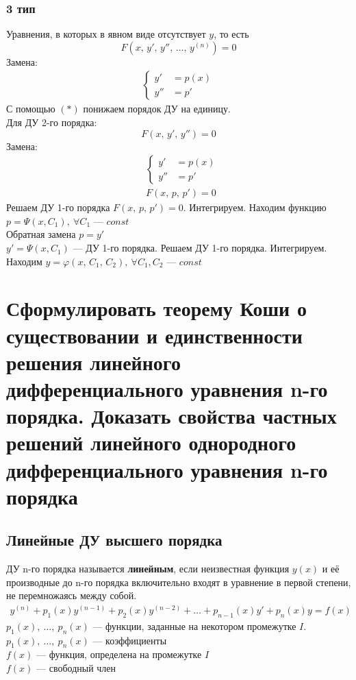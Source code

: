 \subsubsection*{3 тип}
Уравнения, в которых в явном виде отсутствует $y$, то есть
\[
    \boxed{F\left(x,\, y',\, y'',\, \ldots,\, y^{(n)}\right) = 0}
\]
Замена: 
\begin{align*}
    \left\{ \begin{aligned}
        y' &= p(x) \\
        y'' &= p'
    \end{aligned} \right. \tag{$*$}
\end{align*}
С помощью $(*)$ понижаем порядок ДУ на единицу. \\ 
Для ДУ 2-го порядка:
\[
    F(x,\, y',\, y'') = 0
\]
Замена:
\begin{align*}
    & \left\{ \begin{aligned}
        y' &= p(x) \\
        y'' &= p'
    \end{aligned} \right. \tag{$*$} \\
    & F(x,\, p,\, p') = 0
\end{align*}
 Решаем ДУ 1-го порядка $F(x,\, p,\, p') = 0$. Интегрируем. Находим функцию\break$p = \Psi (x, C_1),\ \forall C_1$ --- $const$ \\[1ex]
 Обратная замена $p = y'$ \\[1ex]
 $y' = \Psi (x, C_1)$ --- ДУ 1-го порядка. Решаем ДУ 1-го порядка. Интегрируем. Находим $y = \varphi (x,\, C_1,\, C_2),\ \forall C_1, C_2$ --- $const$

\newpage
\section{Сформулировать теорему Коши о существовании и единственности решения линейного дифференциального уравнения n-го порядка. Доказать свойства частных решений линейного однородного дифференциального уравнения n-го порядка}
\setcounter{equation}{0}
\subsection*{Линейные ДУ высшего порядка}
\begin{definition}
    ДУ n-го порядка называется \textbf{линейным}, если неизвестная функция $y(x)$ и её производные до n-го порядка включительно входят в уравнение в первой степени, не перемножаясь между собой.
    \begin{gather}
        \boxed{y^{(n)} + p_1(x)y^{(n-1)}  + p_2(x)y^{(n-2)} + \ldots + p_{n-1}(x)y' + p_n(x)y = f(x)}
    \end{gather}
    $p_1(x),\ \ldots,\ p_n (x)$ --- функции, заданные на некотором промежутке $I$.\\
    $p_1(x),\ \ldots,\ p_n (x)$ --- коэффициенты \\
    $f(x)$ --- функция, определена на промежутке $I$ \\
    $f(x)$ --- свободный член
\end{definition}

